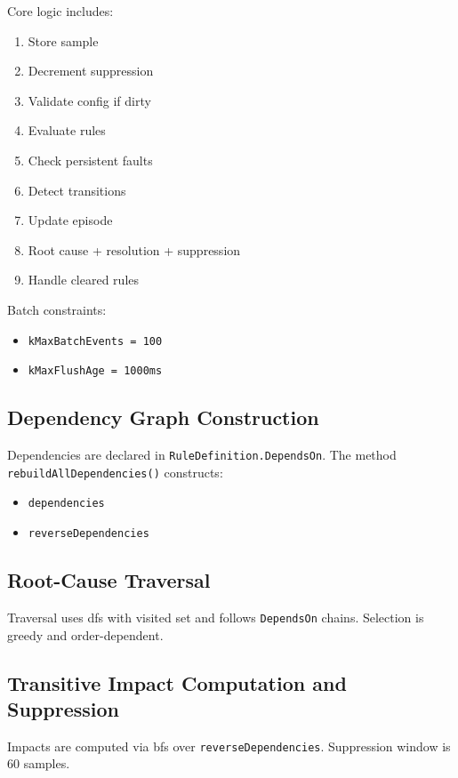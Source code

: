 Core logic includes:

\begin{enumerate}
\item Store sample
\item Decrement suppression
\item Validate config if dirty
\item Evaluate rules
\item Check persistent faults
\item Detect transitions
\item Update episode
\item Root cause + resolution + suppression
\item Handle cleared rules
\end{enumerate}

Batch constraints:
\begin{itemize}
\item \texttt{kMaxBatchEvents = 100}
\item \texttt{kMaxFlushAge = 1000ms}
\end{itemize}

\subsection{Dependency Graph Construction}

Dependencies are declared in \texttt{RuleDefinition.DependsOn}. The method \texttt{rebuildAllDependencies()} constructs:

\begin{itemize}
\item \texttt{dependencies}
\item \texttt{reverseDependencies}
\end{itemize}

\subsection{Root-Cause Traversal}

Traversal uses \gls{dfs} with visited set and follows \texttt{DependsOn} chains. Selection is greedy and order-dependent.

\subsection{Transitive Impact Computation and Suppression}

Impacts are computed via \gls{bfs} over \texttt{reverseDependencies}. Suppression window is 60 samples.
